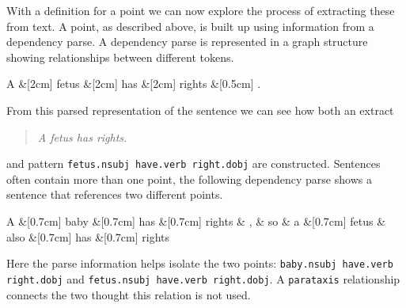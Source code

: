     With a definition for a point we can now explore the process of extracting these from text. A point, as described above, is built up using information from a dependency parse. A dependency parse is represented in a graph structure showing relationships between different tokens.

	\begin{center}
      \begin{dependency}[edge horizontal padding=0]
          \begin{deptext}
              A \&[2cm] fetus \&[2cm] has \&[2cm] rights \&[0.5cm] . \\
          \end{deptext}
      \end{dependency}
	\end{center}
    \vspace{-7mm}

    From this parsed representation of the sentence we can see how both an extract \blockquote{\textit{A fetus has rights.}} and pattern \texttt{fetus.nsubj have.verb right.dobj} are constructed. Sentences often contain more than one point, the following dependency parse shows a sentence that references two different points.

    \vspace{3mm}
	\begin{dependency}[edge horizontal padding=0]
		\begin{deptext}
			A \&[0.7cm] baby \&[0.7cm] has \&[0.7cm] rights \& , \& so \& a \&[0.7cm] fetus \& also \&[0.7cm] has \&[0.7cm] rights \\
		\end{deptext}


	\end{dependency}
    \vspace{-2mm}

    Here the parse information helps isolate the two points: \texttt{baby.nsubj have.verb right.dobj} and \texttt{fetus.nsubj have.verb right.dobj}. A \texttt{parataxis} relationship connects the two thought this relation is not used.

